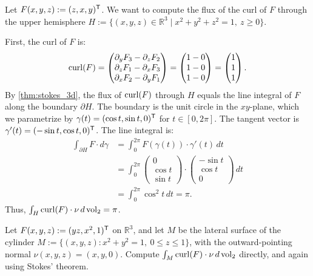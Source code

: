 \begin{example}
\label{ex:stokes_hemisphere_linear_field}
Let $F(x,y,z) := (z, x, y)^{\mathsf{T}}$. We want to compute the flux of the curl of $F$ through the upper hemisphere $H := \{(x,y,z) \in \mathbb{R}^3 \mid x^2 + y^2 + z^2 = 1,\ z \geq 0\}$.

First, the curl of $F$ is:
\[\operatorname{curl}(F) = \begin{pmatrix} \partial_y F_3 - \partial_z F_2 \\ \partial_z F_1 - \partial_x F_3 \\ \partial_x F_2 - \partial_y F_1 \end{pmatrix} = \begin{pmatrix} 1 - 0 \\ 1 - 0 \\ 1 - 0 \end{pmatrix} = \begin{pmatrix} 1 \\ 1 \\ 1 \end{pmatrix}.\]
By \cref{thm:stokes_3d}, the flux of $\operatorname{curl}(F)$ through $H$ equals the line integral of $F$ along the boundary $\partial H$. The boundary is the unit circle in the $xy$-plane, which we parametrize by $\gamma(t) = (\cos t, \sin t, 0)^{\mathsf{T}}$ for $t \in [0, 2\pi]$. The tangent vector is $\gamma'(t) = (-\sin t, \cos t, 0)^{\mathsf{T}}$.
The line integral is:
\begin{align*}
\int_{\partial H} F \cdot d\gamma &= \int_0^{2\pi} F(\gamma(t)) \cdot \gamma'(t) \,dt \\
&= \int_0^{2\pi} \begin{pmatrix} 0 \\ \cos t \\ \sin t \end{pmatrix} \cdot \begin{pmatrix} -\sin t \\ \cos t \\ 0 \end{pmatrix} \,dt \\
&= \int_0^{2\pi} \cos^2 t \,dt = \pi.
\end{align*}
Thus, $\int_H \operatorname{curl}(F) \cdot \nu \,d\operatorname{vol}_2 = \pi$.
\end{example}

\begin{exercise}
\label{ex:cylinder_flux_direct_and_stokes}
Let $F(x,y,z) := (yz,x^2,1)^{\mathsf{T}}$ on $\mathbb{R}^3$, and let $M$ be the lateral surface of the
cylinder $M := \{(x,y,z) : x^2+y^2=1,\ 0\leq z\leq 1\}$, with the outward-pointing normal
$\nu(x,y,z)=(x,y,0)$. Compute $\int_M\operatorname{curl}(F)\cdot\nu\,d\operatorname{vol}_2$ directly, and again using
Stokes' theorem.
\end{exercise}


